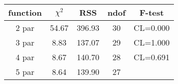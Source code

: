 \begin{tabular}{c|c|c|c|c}
function & $\chi^2$ & RSS & ndof & F-test \\
\hline
2 par & 54.67 & 396.93 & 30 & CL=0.000 \\
3 par & 8.83 & 137.07 & 29 & CL=1.000 \\
4 par & 8.67 & 140.70 & 28 & CL=0.691 \\
5 par & 8.64 & 139.90 & 27 & \\
\hline
\end{tabular}